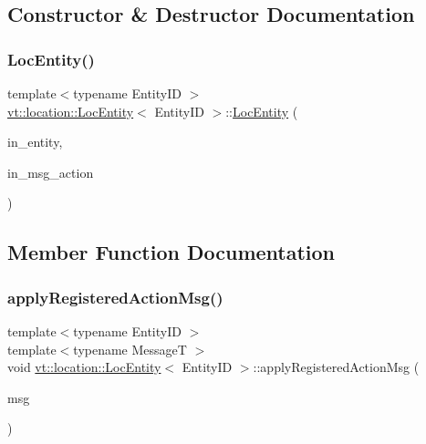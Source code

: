 \subsection{Constructor \& Destructor Documentation}
\mbox{\label{structvt_1_1location_1_1_loc_entity_a41d90430d63f4e299e1c888fcf9d3238}} 
\subsubsection{\texorpdfstring{Loc\+Entity()}{LocEntity()}}
{\footnotesize\ttfamily template$<$typename Entity\+ID $>$ \\
\hyperlink{structvt_1_1location_1_1_loc_entity}{vt\+::location\+::\+Loc\+Entity}$<$ Entity\+ID $>$\+::\hyperlink{structvt_1_1location_1_1_loc_entity}{Loc\+Entity} (\begin{DoxyParamCaption}\item[{Entity\+ID const \&}]{in\+\_\+entity,  }\item[{\hyperlink{namespacevt_1_1location_ad0a130e4d79e745543925240e13e8f08}{Loc\+Msg\+Action\+Type}}]{in\+\_\+msg\+\_\+action }\end{DoxyParamCaption})\hspace{0.3cm}{\ttfamily [inline]}}



\subsection{Member Function Documentation}
\mbox{\label{structvt_1_1location_1_1_loc_entity_a7675dd0ee13bc5b759b6a4313d521e04}} 
\subsubsection{\texorpdfstring{apply\+Registered\+Action\+Msg()}{applyRegisteredActionMsg()}}
{\footnotesize\ttfamily template$<$typename Entity\+ID $>$ \\
template$<$typename MessageT $>$ \\
void \hyperlink{structvt_1_1location_1_1_loc_entity}{vt\+::location\+::\+Loc\+Entity}$<$ Entity\+ID $>$\+::apply\+Registered\+Action\+Msg (\begin{DoxyParamCaption}\item[{MessageT $\ast$}]{msg }\end{DoxyParamCaption})\hspace{0.3cm}{\ttfamily [inline]}}

